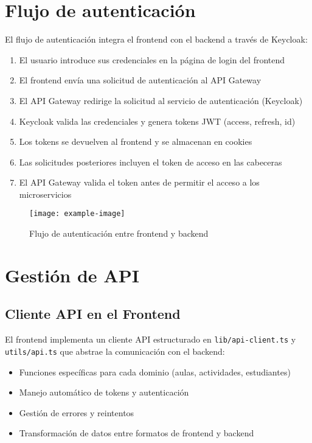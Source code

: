 \documentclass[12pt,a4paper]{report}
\begin{document}
\section{Flujo de autenticación}
El flujo de autenticación integra el frontend con el backend a través de Keycloak:

\begin{enumerate}
    \item El usuario introduce sus credenciales en la página de login del frontend
    \item El frontend envía una solicitud de autenticación al API Gateway
    \item El API Gateway redirige la solicitud al servicio de autenticación (Keycloak)
    \item Keycloak valida las credenciales y genera tokens JWT (access, refresh, id)
    \item Los tokens se devuelven al frontend y se almacenan en cookies
    \item Las solicitudes posteriores incluyen el token de acceso en las cabeceras
    \item El API Gateway valida el token antes de permitir el acceso a los microservicios
\end{enumerate}

\begin{figure}[H]
    \centering
    \texttt{[image: example-image]}
    \caption{Flujo de autenticación entre frontend y backend}
    \label{fig:auth-flow}
\end{figure}

\section{Gestión de API}
\subsection{Cliente API en el Frontend}
El frontend implementa un cliente API estructurado en \texttt{lib/api-client.ts} y \texttt{utils/api.ts} que abstrae la comunicación con el backend:

\begin{itemize}
    \item Funciones específicas para cada dominio (aulas, actividades, estudiantes)
    \item Manejo automático de tokens y autenticación
    \item Gestión de errores y reintentos
    \item Transformación de datos entre formatos de frontend y backend
\end{itemize}
\end{document}
